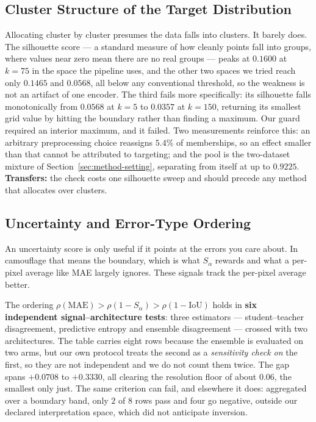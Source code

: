 \documentclass{article} %
\begin{document}
\subsection{Cluster Structure of the Target Distribution}
\label{sec:diss-structure}

Allocating cluster by cluster presumes the data falls into clusters. It barely does. The silhouette
score --- a standard measure of how cleanly points fall into groups, where values near zero mean
there are no real groups --- peaks at $0.1600$ at $k = 75$ in the space the pipeline uses, and the
other two spaces we tried reach only $0.1465$ and $0.0568$, all below any conventional threshold, so
the weakness is not an artifact of one encoder. The third fails more specifically: its silhouette
falls monotonically from $0.0568$ at $k=5$ to $0.0357$ at $k=150$, returning its smallest grid value
by hitting the boundary rather than finding a maximum. Our guard required an interior maximum, and
it failed. Two measurements reinforce this: an arbitrary preprocessing choice reassigns $5.4\%$ of
memberships, so an effect smaller than that cannot be attributed to targeting; and the pool is the
two-dataset mixture of Section~\ref{sec:method-setting}, separating from itself at up to $0.9225$.
\textbf{Transfers:} the check costs one silhouette sweep and should precede any method that allocates
over clusters.

\subsection{Uncertainty and Error-Type Ordering}
\label{sec:diss-ordering}

An uncertainty score is only useful if it points at the errors you care about. In camouflage that
means the boundary, which is what $S_\alpha$ rewards and what a per-pixel average like MAE largely
ignores. These signals track the per-pixel average better.

The ordering $\rho(\mathrm{MAE}) > \rho(1-S_\alpha) > \rho(1-\mathrm{IoU})$ holds in \textbf{six
independent signal--architecture tests}: three estimators --- student--teacher disagreement,
predictive entropy and ensemble disagreement --- crossed with two architectures. The table carries
eight rows because the ensemble is evaluated on two arms, but our own protocol treats the second as
a \emph{sensitivity check on} the first, so they are not independent and we do not count them twice.
The gap spans $+0.0708$ to $+0.3330$, all clearing the resolution floor of about $0.06$, the
smallest only just. The same criterion can fail, and elsewhere it does: aggregated over a boundary
band, only $2$ of $8$ rows pass and four go negative, outside our declared interpretation space,
which did not anticipate inversion.
\end{document}
